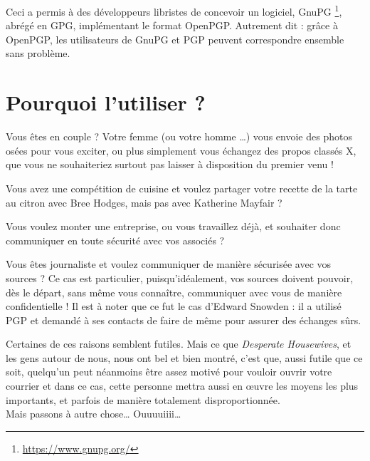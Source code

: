 Ceci a permis à des développeurs libristes de concevoir un logiciel, GnuPG
\footnote{\url{https://www.gnupg.org/}}, abrégé en GPG, implémentant le format OpenPGP. Autrement dit : grâce à OpenPGP, les utilisateurs de
GnuPG et PGP peuvent correspondre ensemble sans problème.

\section{Pourquoi l'utiliser ?}\label{pourquoi-lutiliser}

Vous êtes en couple ? Votre femme (ou votre homme \ldots{}) vous envoie
des photos osées pour vous exciter, ou plus simplement vous échangez des
propos classés X, que vous ne souhaiteriez surtout pas laisser à
disposition du premier venu !

Vous avez une compétition de cuisine et voulez partager votre recette de la tarte au citron avec Bree Hodges, mais pas avec Katherine Mayfair ?

Vous voulez monter une entreprise, ou vous travaillez déjà, et souhaiter donc communiquer en toute sécurité avec vos associés ?

Vous êtes journaliste et voulez communiquer de manière sécurisée avec vos sources ? Ce cas est
particulier, puisqu'idéalement, vos sources doivent pouvoir, dès le départ, sans même vous connaître, communiquer avec vous de manière
confidentielle ! Il est à noter que ce fut le cas d'Edward Snowden : il a utilisé PGP et demandé à ses contacts de faire de même pour assurer
des échanges sûrs.

Certaines de ces raisons semblent futiles. Mais ce que \emph{Desperate Housewives}, et les gens autour de nous, nous ont bel et bien montré,
c'est que, aussi futile que ce soit, quelqu'un peut néanmoins être assez motivé pour vouloir ouvrir votre courrier et dans ce cas, cette personne
mettra aussi en œuvre les moyens les plus importants, et parfois de manière totalement disproportionnée.\\

Mais passons à autre chose\ldots{}
Ouuuuiiii\ldots{}\\

